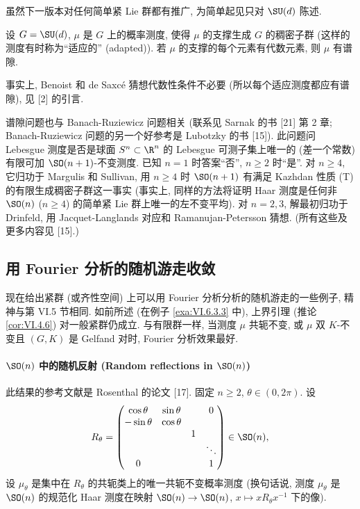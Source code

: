 虽然下一版本对任何简单紧 Lie 群都有推广, 为简单起见只对 $\SU(d)$ 陈述.

\begin{theorem}[代数支撑的谱隙]
\label{thm:VI.6.3.6}
设 $G = \SU(d)$, $\mu$ 是 $G$ 上的概率测度, 使得 $\mu$ 的支撑生成 $G$ 的稠密子群 (这样的测度有时称为``适应的'' (adapted)).
若 $\mu$ 的支撑的每个元素有代数元素, 则 $\mu$ 有谱隙.
\end{theorem}

事实上, Benoist 和 de Saxc\'e 猜想代数性条件不必要 (所以每个适应测度都应有谱隙), 见 {[}2{]} 的引言.

\begin{remark}
\label{rem:VI.6.3.7}
谱隙问题也与 Banach-Ruziewicz 问题相关 (联系见 Sarnak 的书 {[}21{]} 第 2 章; Banach-Ruziewicz 问题的另一个好参考是 Lubotzky 的书 {[}15{]}). 此问题问 Lebesgue 测度是否是球面 $S^n \subset \R^n$ 的 Lebesgue 可测子集上唯一的 (差一个常数) 有限可加 $\SO(n+1)$-不变测度. 已知 $n = 1$ 时答案``否'', $n \geq 2$ 时``是''. 对 $n \geq 4$, 它归功于 Margulis 和 Sullivan, 用 $n \geq 4$ 时 $\SO(n+1)$ 有满足 Kazhdan 性质 (T) 的有限生成稠密子群这一事实 (事实上, 同样的方法将证明 Haar 测度是任何非 $\SO(n)$ ($n \geq 4$) 的简单紧 Lie 群上唯一的左不变平均). 对 $n = 2, 3$, 解最初归功于 Drinfeld, 用 Jacquet-Langlands 对应和 Ramanujan-Petersson 猜想. (所有这些及更多内容见 {[}15{]}.)
\end{remark}

\subsection{用 Fourier 分析的随机游走收敛}
现在给出紧群 (或齐性空间) 上可以用 Fourier 分析分析的随机游走的一些例子, 精神与第 VI.5 节相同.
如前所述 (在例子 \ref{exa:VI.6.3.3} 中), 上界引理 (推论 \ref{cor:VI.4.6}) 对一般紧群仍成立.
与有限群一样, 当测度 $\mu$ 共轭不变, 或 $\mu$ 双 $K$-不变且 $(G, K)$ 是 Gelfand 对时, Fourier 分析效果最好.

\paragraph{$\SO(n)$ 中的随机反射 (Random reflections in $\SO(n)$)}
此结果的参考文献是 Rosenthal 的论文 {[}17{]}. 固定 $n \geq 2$, $\theta \in (0, 2\pi)$. 设
\[
R_{\theta} = \begin{pmatrix} \cos\theta & \sin\theta & & 0 \\ -\sin\theta & \cos\theta & & \\ & & 1 & \\ & & & \ddots \\ 0 & & & 1 \end{pmatrix} \in \SO(n),
\]
设 $\mu_{\theta}$ 是集中在 $R_{\theta}$ 的共轭类上的唯一共轭不变概率测度 (换句话说, 测度 $\mu_{\theta}$ 是 $\SO(n)$ 的规范化 Haar 测度在映射 $\SO(n) \to \SO(n)$, $x \longmapsto xR_{\theta}x^{-1}$ 下的像).

